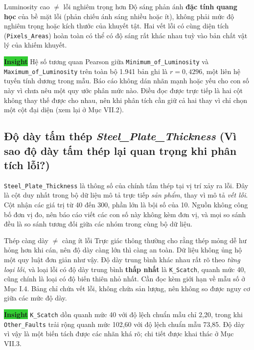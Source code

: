 \documentclass[12pt]{article}
\begin{document}
\begin{misconceptionbox}{Luminosity cao $\neq$ lỗi nghiêm trọng hơn}
Độ sáng phản ánh \textbf{đặc tính quang học} của bề mặt lỗi (phản chiếu ánh sáng nhiều hoặc ít), không phải mức độ nghiêm trọng hoặc kích thước của khuyết tật. Hai vết lỗi có cùng diện tích (\texttt{Pixels\_Areas}) hoàn toàn có thể có độ sáng rất khác nhau tuỳ vào bản chất vật lý của khiếm khuyết.
\end{misconceptionbox}

\noindent \colorbox{LimeGreen}{\textbf{Insight}} Hệ số tương quan Pearson giữa \texttt{Minimum\_of\_Luminosity} và \texttt{Maximum\_of\_Luminosity} trên toàn bộ 1.941 bản ghi là $r = 0{,}4296$, một liên hệ tuyến tính dương trong mẫu. Báo cáo không dán nhãn mạnh hoặc yếu cho con số này vì chưa nêu một quy ước phân mức nào. Điều đọc được trực tiếp là hai cột không thay thế được cho nhau, nên khi phân tích cần giữ cả hai thay vì chỉ chọn một cột đại diện (xem lại ở Mục VII.2).

\subsection{Độ dày tấm thép \textit{Steel\_Plate\_Thickness} (Vì sao độ dày tấm thép lại quan trọng khi phân tích lỗi?)}

\texttt{Steel\_Plate\_Thickness} là thông số của chính tấm thép tại vị trí xảy ra lỗi. Đây là cột duy nhất trong bộ dữ liệu mô tả trực tiếp \emph{sản phẩm}, thay vì mô tả \emph{vết lỗi}. Cột nhận các giá trị từ 40 đến 300, phần lớn là bội số của 10. Nguồn không công bố đơn vị đo, nên báo cáo viết các con số này không kèm đơn vị, và mọi so sánh đều là so sánh tương đối giữa các nhóm trong cùng bộ dữ liệu.

\begin{misconceptionbox}{Thép càng dày $\neq$ càng ít lỗi}
Trực giác thông thường cho rằng thép mỏng dễ hư hỏng hơn khi cán, nên độ dày càng lớn thì càng an toàn. Dữ liệu không ủng hộ một quy luật đơn giản như vậy. Độ dày trung bình khác nhau rất rõ theo \emph{từng loại lỗi}, và loại lỗi có độ dày trung bình \textbf{thấp nhất} là \texttt{K\_Scatch}, quanh mức 40, cũng chính là loại có độ biến thiên nhỏ nhất. Cần đọc kèm giới hạn về mẫu số ở Mục I.4. Bảng chỉ chứa vết lỗi, không chứa sản lượng, nên không so được nguy cơ giữa các mức độ dày.
\end{misconceptionbox}

\noindent \colorbox{LimeGreen}{\textbf{Insight}} \texttt{K\_Scatch} dồn quanh mức 40 với độ lệch chuẩn mẫu chỉ 2,20, trong khi \texttt{Other\_Faults} trải rộng quanh mức 102,60 với độ lệch chuẩn mẫu 73,85. Độ dày vì vậy là một biến tách được các nhãn khá rõ; chi tiết được khai thác ở Mục VII.3.
\end{document}
